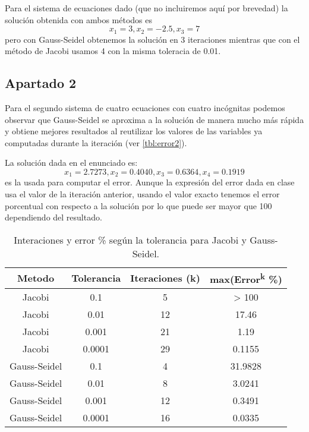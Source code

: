 Para el sistema de ecuaciones dado (que no incluiremos aquí por brevedad) la solución obtenida con ambos métodos es \[x_1=3 , x_2=-2.5 , x_3=7\] pero con Gauss-Seidel obtenemos la solución en 3 iteraciones mientras que con el método de Jacobi usamos 4 con la misma toleracia de 0.01.

\subsection{Apartado 2}

Para el segundo sistema de cuatro ecuaciones con cuatro incógnitas podemos observar que Gauss-Seidel se aproxima a la solución de manera mucho más rápida y obtiene mejores resultados al reutilizar los valores de las variables ya computadas durante la iteración (ver \autoref{tbl:error2}).

La solución dada en el enunciado es: \[x_1=2.7273 , x_2 = 0.4040 , x_3 = 0.6364 , x_4 = 0.1919\] es la usada para computar el error. Aunque la expresión del error dada en clase usa el valor de la iteración anterior, usando el valor exacto tenemos el error porcentual con respecto a la solución por lo que puede ser mayor que 100 dependiendo del resultado.

\begin{table}
\begin{center}
\begin{tabular}{ |c|c|c|c| } 
 \hline 
 Metodo & Tolerancia & Iteraciones (k) & max(Error\textsuperscript{k} \%) \\ 
 \hline \hline
 Jacobi &  0.1 & 5 & > 100 \\
 \hline
 Jacobi &  0.01 & 12 & 17.46\\
 \hline
 Jacobi &  0.001 & 21 & 1.19\\
 \hline
 Jacobi &  0.0001 & 29 & 0.1155\\
 \hline
 Gauss-Seidel & 0.1 & 4 & 31.9828\\
 \hline
 Gauss-Seidel & 0.01 & 8 & 3.0241\\
 \hline
 Gauss-Seidel & 0.001 & 12 & 0.3491\\
 \hline
 Gauss-Seidel & 0.0001 & 16 &  0.0335\\
 \hline
\end{tabular}
\end{center}
\caption{Interaciones y error \% según la tolerancia para Jacobi y Gauss-Seidel.}
\label{tbl:error2}
\end{table}